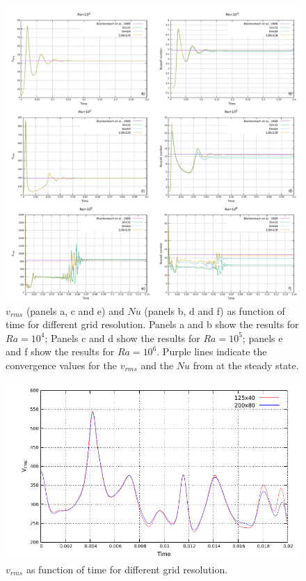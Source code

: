 \documentclass[draft,tec]{agutexSI2019}
\begin{document}
\begin{figure}
\noindent\includegraphics[width=\textwidth]{./Figures/Convection.pdf}
\caption{$v_{rms}$ (panels a, c and e) and $Nu$ (panels b, d and f) as function of time for different grid resolution. Panels a and b show the results for $Ra=10^4$; Panels c and d show the results for $Ra=10^5$; panels e and f show the results for $Ra=10^6$. Purple lines indicate the convergence values for the $v_{rms}$ and the $Nu$ from  at the steady state.}
\label{fig:mantle}
\end{figure}

\begin{figure}
\noindent\includegraphics[width=\textwidth]{./Figures/Thin_Layer.pdf}
\caption{$v_{rms}$ as function of time for different grid resolution.}
\label{fig:thin}
\end{figure}
\end{document}
